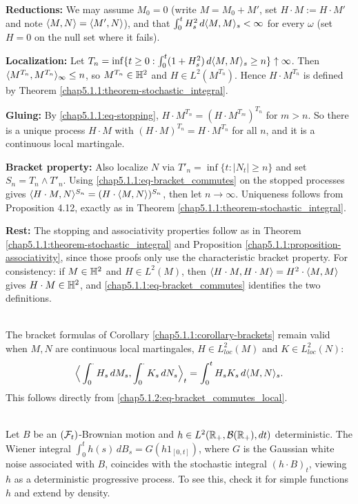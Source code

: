 \begin{proofidea}
\textbf{Reductions:} We may assume $M_0=0$ (write $M=M_0+M'$, set $H\cdot M := H\cdot M'$ and note $\langle M,N\rangle=\langle M',N\rangle$), and that $\int_0^t H_s^2\,d\langle M,M\rangle_s<\infty$ for every $\omega$ (set $H=0$ on the null set where it fails).

\textbf{Localization:} Let $T_n=\inf\{t\geq 0: \int_0^t(1+H_s^2)\,d\langle M,M\rangle_s\geq n\}\uparrow\infty$. Then $\langle M^{T_n},M^{T_n}\rangle_\infty\leq n$, so $M^{T_n}\in\mathbb{H}^2$ and $H\in L^2(M^{T_n})$. Hence $H\cdot M^{T_n}$ is defined by Theorem \ref{chap5.1.1:theorem-stochastic_integral}.

\textbf{Gluing:} By \eqref{chap5.1.1:eq-stopping}, $H\cdot M^{T_n}=(H\cdot M^{T_m})^{T_n}$ for $m>n$. So there is a unique process $H\cdot M$ with $(H\cdot M)^{T_n}=H\cdot M^{T_n}$ for all $n$, and it is a continuous local martingale.

\textbf{Bracket property:} Also localize $N$ via $T'_n=\inf\{t:|N_t|\geq n\}$ and set $S_n=T_n\wedge T'_n$. Using \eqref{chap5.1.1:eq-bracket_commutes} on the stopped processes gives $\langle H\cdot M,N\rangle^{S_n}=(H\cdot\langle M,N\rangle)^{S_n}$, then let $n\to\infty$. Uniqueness follows from Proposition 4.12, exactly as in Theorem \ref{chap5.1.1:theorem-stochastic_integral}.

\textbf{Rest:} The stopping and associativity properties follow as in Theorem \ref{chap5.1.1:theorem-stochastic_integral} and Proposition \ref{chap5.1.1:proposition-associativity}, since those proofs only use the characteristic bracket property. For consistency: if $M\in\mathbb{H}^2$ and $H\in L^2(M)$, then $\langle H\cdot M,H\cdot M\rangle=H^2\cdot\langle M,M\rangle$ gives $H\cdot M\in\mathbb{H}^2$, and \eqref{chap5.1.1:eq-bracket_commutes} identifies the two definitions.
\end{proofidea}

\begin{remark}\label{chap5.1.2:remark-brackets_local}
\\
The bracket formulas of Corollary \ref{chap5.1.1:corollary-brackets} remain valid when $M,N$ are continuous local martingales, $H\in L^2_{loc}(M)$ and $K\in L^2_{loc}(N)$:
$$\Big\langle \int_0^\cdot H_s\,dM_s, \int_0^\cdot K_s\,dN_s\Big\rangle_t = \int_0^t H_sK_s\,d\langle M,N\rangle_s.$$
This follows directly from \eqref{chap5.1.2:eq-bracket_commutes_local}.
\end{remark}

\begin{remark}\label{chap5.1.2:remark-wiener_integral}
\\
Let $B$ be an $(\mathcal{F}_t)$-Brownian motion and $h\in L^2(\mathbb{R}_+,\mathcal{B}(\mathbb{R}_+),dt)$ deterministic. The Wiener integral $\int_0^t h(s)\,dB_s = G(h1_{[0,t]})$, where $G$ is the Gaussian white noise associated with $B$, coincides with the stochastic integral $(h\cdot B)_t$, viewing $h$ as a deterministic progressive process. To see this, check it for simple functions $h$ and extend by density.
\end{remark}

